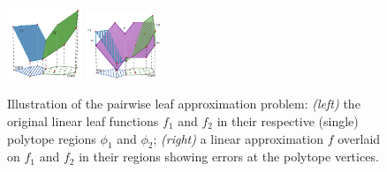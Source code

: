 \begin{figure}[t!]
\center
\includegraphics[trim = 2cm 0cm 2cm 0cm, height=0.25\textwidth,width=0.2\textwidth]{Figures/optimDiag/optdiagram1.pdf} 
\hspace{2mm}
\includegraphics[trim = 2cm 0cm 2cm 0cm, height=0.25\textwidth,width=0.2\textwidth]{Figures/optimDiag/optdiagram2.pdf}
\caption{\footnotesize Illustration of the pairwise leaf approximation problem: \emph{(left)} the original linear leaf functions $f_1$ and $f_2$ in their respective (single) polytope regions $\phi_1$ and $\phi_2$; \emph{(right)} a linear approximation $f$ overlaid on $f_1$ and $f_2$ in their regions showing errors at the polytope vertices.}
\label{fig:optim} 
\end{figure}

